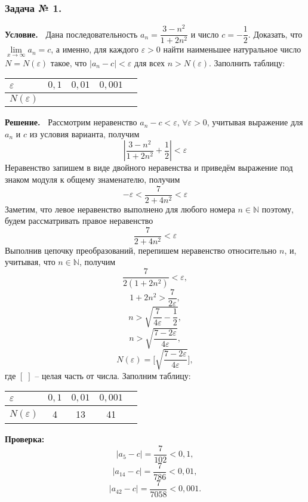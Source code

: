 \documentclass[12pt]{article}
\begin{document}
\subsubsection*{\center Задача № 1.}
{\bf Условие.~}
Дана последовательность $a_{n}=\dfrac{3-n^2}{1+2n^2}$ и число $c=-\dfrac{1}{2}$. Доказать, что $\lim\limits_{x\rightarrow\infty} a_{n}=c $, а именно, для каждого $\varepsilon>0$ найти наименьшее натуральное число  $N{=}N(\varepsilon)$ такое, что $|a_{n}-c|<\varepsilon$ для всех $n>N(\varepsilon)$. Заполнить таблицу: 
\begin{center}
\begin{tabular}{ | p{25pt} | c | c | c | c |}
\hline
$\varepsilon$& $0{,}1$ & $0{,}01$ & $0{,}001$ \\ \hline
$N(\varepsilon)$ &   &   &\\
\hline
\end{tabular}
\end{center}
\medskip
{\bf Решение.~}
Рассмотрим неравенство $a_{n}-c<\varepsilon$, $\forall\varepsilon>0$, учитывая выражение для $a_{n}$ и $c$ из условия варианта, получим 
$$\left|\frac{3-n^2}{1+2n^2}+\frac{1}{2}\right|<\varepsilon$$
Неравенство запишем в виде двойного неравенства и приведём выражение под знаком модуля к общему знаменателю, получим
$${-}\varepsilon <\dfrac{7}{2+4n^2}<\varepsilon$$
Заметим, что левое неравенство выполнено для любого номера $n\in \mathbb{N}$ поэтому, будем рассматривать правое неравенство
$$\frac{7}{2+4n^2}<\varepsilon$$
Выполнив цепочку преобразований, перепишем неравенство относительно $n$, и, учитывая, что $n\in \mathbb{N}$, получим 
$$\dfrac{7}{2(1+2n^2)}<\varepsilon,$$
$$1+2n^2>\dfrac{7}{2\varepsilon},$$
$$n>\sqrt{\dfrac{7}{4\varepsilon}-\dfrac{1}{2}},$$
$$n>\sqrt{\dfrac{7-2\varepsilon}{4\varepsilon}},$$
$$N(\varepsilon)=\biggl[\sqrt{\dfrac{7-2\varepsilon}{4\varepsilon}}\biggr],$$
где $[\;]$ -- целая часть от числа. Заполним таблицу:
\begin{center}
\begin{tabular}{ | p{25pt} | c | c | c | c |}
\hline
$\varepsilon$& $0{,}1$ & $0{,}01$ & $0{,}001$ \\ \hline
$N(\varepsilon)$ & 4  & 13 & 41\\
\hline
\end{tabular}
\end{center}
{\bf Проверка:~}
$$|a_{5}-c|=\dfrac{7}{102}<0{,}1,$$
$$|a_{14}-c|=\dfrac{7}{786}<0{,}01,$$
$$|a_{42}-c|=\dfrac{7}{7058}<0{,}001.$$
\newpage
\end{document}
